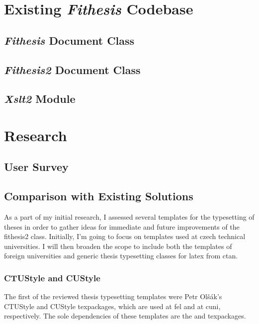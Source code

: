   \chapter{Existing \emph{Fithesis} Codebase}
    \blindtext
    
    \section{\emph{Fithesis} Document Class}
    \blindtext

    \section{\emph{Fithesis2} Document Class}
    \blindtext

    \section{\emph{Xslt2} Module}
    \blindtext

  \chapter{Research}
    \blindtext

    \section{User Survey}
    \blindtext

    \section{Comparison with Existing Solutions}
    As a part of my initial research, I assessed several templates for the typesetting of theses in order to gather ideas for immediate and future improvements of the fithesis2 class. Initially, I'm going to focus on templates used at czech technical universities. I will then broaden the scope to include both the templates of foreign universities and generic thesis typesetting classes for \gls{latex} from \gls{ctan}.

      \subsection{CTUStyle and CUStyle}
      The first of the reviewed thesis typesetting templates were Petr Olšák's CTUStyle \cite{ctustyle} and CUStyle \cite{custyle} \glspl{texpackage}, which are used at \gls{fel} and at \gls{cuni}, respectively. The sole dependencies of these templates are the  and  \glspl{texpackage}.

